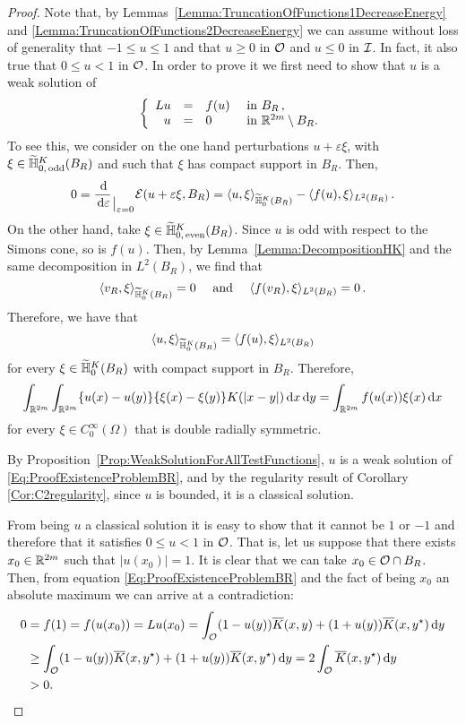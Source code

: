 \begin{proof}

Note that, by Lemmas~\ref{Lemma:TruncationOfFunctions1DecreaseEnergy} and \ref{Lemma:TruncationOfFunctions2DecreaseEnergy} we can assume without loss of generality that $-1 \leq u \leq 1$ and that $u \geq 0$ in $\mathcal{O}$ and $u \leq 0$ in $\mathcal{I}$. In fact, it also true that $0\leq u < 1$ in $\mathcal{O}$. In order to prove it we first need to show that $u$ is a weak solution of
\begin{equation}
\label{Eq:ProofExistenceProblemBR}
	\left\{\begin{array}{rcll}
	L u &=& f(u) & \textrm{ in } B_R\,,\\
	u &=& 0 & \textrm{ in }\mathbb{R}^{2m} \setminus B_R.
	\end{array} \right.
\end{equation}
To see this, we consider on the one hand perturbations $u +  \varepsilon \xi$, with $\xi \in \widetilde{\mathbb{H}}^K_{0, \,\mathrm{odd}}(B_R)$ and such that $\xi$ has compact support in $B_R$. Then, 
$$
0 = \dfrac{\,\mathrm{d}}{\,\mathrm{d} \varepsilon}_{\mkern1.5mu\big\vert_{\scriptstyle \varepsilon = 0}} \mathcal{E}(u +  \varepsilon \xi, B_R) = \langle u,\xi \rangle_{\widetilde{\mathbb{H}}^K_0(B_R)} - \langle f(u),\xi \rangle_{L^2(B_R)}\,.
$$
On the other hand, take $\xi \in \widetilde{\mathbb{H}}^K_{0, \,\mathrm{even}}(B_R)$. Since $u$ is odd with respect to the Simons cone, so is $f(u)$. Then, by Lemma~\ref{Lemma:DecompositionHK} and the same decomposition in $L^2(B_R)$, we find that
$$
\langle v_R,\xi \rangle_{\widetilde{\mathbb{H}}^K_0(B_R)} = 0 \quad \textrm{ and } \quad  \langle f(v_R),\xi \rangle_{L^2(B_R)} = 0\,.
$$
Therefore, we have that
$$
\langle u,\xi \rangle_{\widetilde{\mathbb{H}}^K_0(B_R)} = \langle f(u),\xi \rangle_{L^2(B_R)}
$$
for every $\xi \in\widetilde{\mathbb{H}}^K_0(B_R)$ with compact support in  $B_R$. Therefore,
$$
\int_{\mathbb{R}^{2m}}\int_{\mathbb{R}^{2m}} \{u(x)-u(y)\}\{\xi(x)-\xi(y)\} K(|x-y|) \,\mathrm{d} x \,\mathrm{d} y = \int_{\mathbb{R}^{2m}} f(u(x)) \xi(x) \,\mathrm{d} x
$$
for every $\xi \in C^\infty_0(\Omega)$ that is double radially symmetric.

By Proposition~\ref{Prop:WeakSolutionForAllTestFunctions}, $u$ is a weak solution of \eqref{Eq:ProofExistenceProblemBR}, and by the regularity result of Corollary \ref{Cor:C2regularity}, since $u$ is bounded, it is a classical solution.

From being $u$ a classical solution it is easy to show that it cannot be $1$ or $-1$ and therefore that it satisfies $0\leq u < 1$ in $\mathcal{O}$. That is, let us suppose that there exists $x_0\in\mathbb{R}^{2m}$ such that $|u(x_0)|=1$. It is clear that we can take $x_0\in\mathcal{O}\cap B_R$. Then, from equation \eqref{Eq:ProofExistenceProblemBR} and the fact of being $x_0$ an absolute maximum we can arrive at a contradiction:
\begin{align*}
0 &= f(1) = f(u(x_0)) = Lu(x_0) = \int_{\mathcal{O}} (1-u(y)) \overline{K}(x,y) + (1+u(y)) \overline{K}(x,y^\star)  \,\mathrm{d} y \\
&\geq \int_{\mathcal{O}} (1-u(y)) \overline{K}(x,y^\star) + (1+u(y)) \overline{K}(x,y^\star)  \,\mathrm{d} y = 2\int_{\mathcal{O}} \overline{K}(x,y^\star) \,\mathrm{d} y\\
&>0.
\end{align*}



\end{proof}
